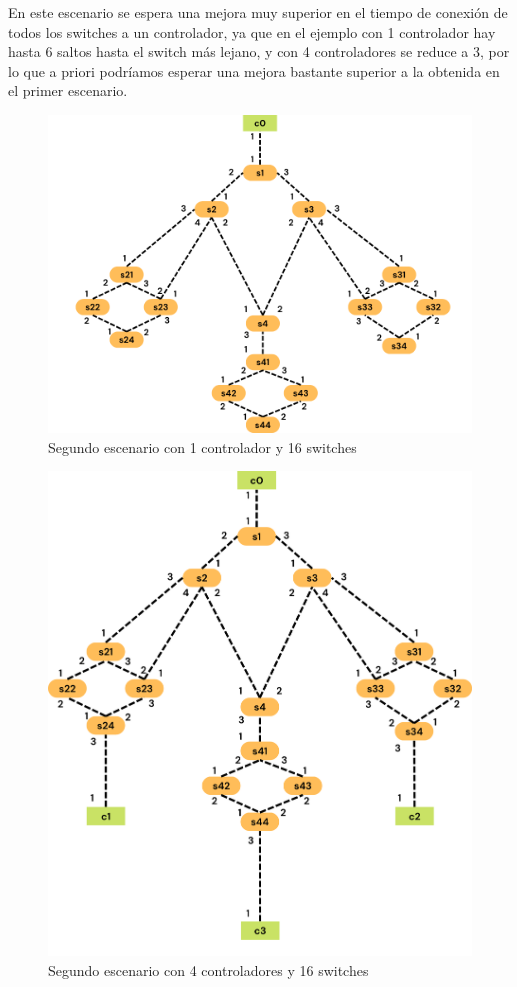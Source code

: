 \documentclass[a4paper, 12pt]{book}
\begin{document}
 	En este escenario se espera una mejora muy superior en el tiempo de conexión de todos los switches a un controlador, ya que en el ejemplo con 1 controlador hay hasta 6 saltos hasta el switch más lejano, y con 4 controladores se reduce a 3, por lo que a priori podríamos esperar una mejora bastante superior a la obtenida en el primer escenario.
 	
 	\begin{figure}[H]
 		\centering
 		\includegraphics[width=16cm, keepaspectratio]{img/escenario2-1}
 		\caption{Segundo escenario con 1 controlador y 16 switches}
 		\label{figura:escenario2-1c}
 	\end{figure}
 	
 	\begin{figure}[H]
 		\centering
 		\includegraphics[width=14cm, keepaspectratio]{img/escenario2-2}
 		\caption{Segundo escenario con 4 controladores y 16 switches}
 		\label{figura:escenario2-4c}
 	\end{figure}
 	
\end{document}
